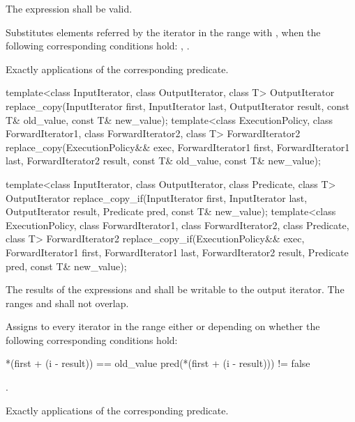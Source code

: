 \begin{itemdescr}
\pnum
\requires
The expression
shall be valid.

\pnum
\effects
Substitutes elements referred by the iterator
in the range 
with ,
when the following corresponding conditions hold:
, .

\pnum
\complexity
Exactly
applications of the corresponding predicate.
\end{itemdescr}

%
%
\begin{itemdecl}
template<class InputIterator, class OutputIterator, class T>
  OutputIterator
    replace_copy(InputIterator first, InputIterator last,
                 OutputIterator result,
                 const T& old_value, const T& new_value);
template<class ExecutionPolicy, class ForwardIterator1, class ForwardIterator2, class T>
  ForwardIterator2
    replace_copy(ExecutionPolicy&& exec,
                 ForwardIterator1 first, ForwardIterator1 last,
                 ForwardIterator2 result,
                 const T& old_value, const T& new_value);

template<class InputIterator, class OutputIterator, class Predicate, class T>
  OutputIterator
    replace_copy_if(InputIterator first, InputIterator last,
                    OutputIterator result,
                    Predicate pred, const T& new_value);
template<class ExecutionPolicy, class ForwardIterator1, class ForwardIterator2,
         class Predicate, class T>
  ForwardIterator2
    replace_copy_if(ExecutionPolicy&& exec,
                    ForwardIterator1 first, ForwardIterator1 last,
                    ForwardIterator2 result,
                    Predicate pred, const T& new_value);
\end{itemdecl}

\begin{itemdescr}
\pnum
\requires
The results of the expressions
and
shall be writable to the
output iterator.
The ranges
and
shall not overlap.

\pnum
\effects
Assigns to every iterator
in the
range
either
or
depending on whether the following corresponding conditions hold:

\begin{codeblock}
*(first + (i - result)) == old_value
pred(*(first + (i - result))) != false
\end{codeblock}

\pnum
\returns
{}.

\pnum
\complexity
Exactly
applications of the corresponding predicate.
\end{itemdescr}

